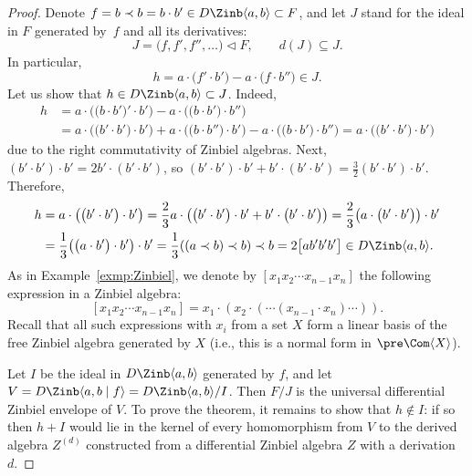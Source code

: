 \begin{proof}
Denote $f=b\prec b=b\cdot b' \in D\Zinb \langle a,b\rangle \subset F$, and let $J$ stand for the ideal in $F$ generated by~$f$ and all its derivatives:
\[
J = \bigl(f,f',f'', \dots \bigr) \triangleleft F,\qquad d(J)\subseteq J.
\]
In particular,
\[
h = a\cdot \bigl(f'\cdot b'\bigr)-a\cdot \bigl(f\cdot b''\bigr) \in J.
\]
Let us show that $h\in D\Zinb \langle a,b\rangle \subset J$.
Indeed,
\begin{align*}
h &= a\cdot \bigl(\bigl(b\cdot b'\bigr)'\cdot b'\bigr)-a\cdot \bigl(\bigl(b\cdot b'\bigr)\cdot b''\bigr) \\
 &= a\cdot \bigl(\bigl(b'\cdot b'\bigr)\cdot b'\bigr) + a\cdot \bigl(\bigl(b\cdot b''\bigr)\cdot b'\bigr)-a\cdot \bigl(\bigl(b\cdot b'\bigr)\cdot b''\bigr)
 = a\cdot \bigl(\bigl(b'\cdot b'\bigr)\cdot b'\bigr)
\end{align*}
due to the right commutativity of Zinbiel algebras.
Next,
$(b'\cdot b')\cdot b' = 2b'\cdot (b'\cdot b')$,
so
$(b'\cdot b')\cdot b'+b'\cdot (b'\cdot b')
= \frac{3}{2} (b'\cdot b')\cdot b'$.
Therefore,
\begin{align*}
h &= a\cdot \bigl(\bigl(b'\cdot b'\bigr)\cdot b'\bigr)
= \frac{2}{3} a\cdot \bigl(\bigl(b'\cdot b'\bigr)\cdot b' + b'\cdot \bigl(b'\cdot b'\bigr)\bigr)
 = \frac{2}{3} \bigl(a\cdot \bigl(b'\cdot b'\bigr)\bigr)\cdot b'
 \\
 &= \frac{1}{3} \bigl(\bigl(a\cdot b'\bigr)\cdot b'\bigr)\cdot b'= \frac{1}{3} ((a\prec b)\prec b)\prec b = 2\bigl[ab'b'b'\bigr]
 \in D\Zinb \langle a,b\rangle .
\end{align*}
As in Example~\ref{exmp:Zinbiel}, we denote by
$[x_1x_2\cdots x_{n-1}x_n]$ the following expression
in a Zinbiel algebra:
\[
[x_1x_2\cdots x_{n-1}x_n]
= x_1\cdot (x_2\cdot (\cdots (x_{n-1}\cdot x_n)\cdots )).
\]
Recall \cite{Loday} that all such expressions with $x_i$
from a set $X$ form a linear basis of the free Zinbiel algebra
generated by $X$ (i.e., this is a normal form in $\pre\Com\langle X\rangle $).

Let $I$ be the ideal in $D\Zinb \langle a,b\rangle $
generated by $f$, and let $V = D\Zinb \langle a,b\mid f\rangle
=D\Zinb \langle a,b\rangle/I $.
Then
$F/J$ is the universal differential Zinbiel envelope
of $V$. To prove the theorem, it remains to show that $h\notin I$:
if so then $h+I$
would lie in the kernel of every homomorphism
from $V$ to the derived algebra $Z^{(d)}$
constructed
from a differential Zinbiel algebra $Z$ with a derivation~$d$.


\end{proof}
